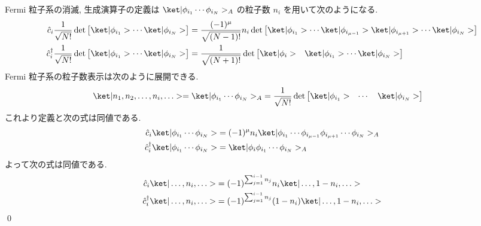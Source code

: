 \documentclass[uplatex,dvipdfmx,a4paper,11pt]{jlreq}
\makeatletter
\numberwithin{equation}{section}
\theoremstyle{definition}
\renewenvironment{proof}[1][\proofname]{\par
  \normalfont
  \topsep6\p@\@plus6\p@ \trivlist
  \item[\hskip\labelsep{\bfseries #1}\@addpunct{\bfseries}]\ignorespaces\quad\par
}{%
  \qed\endtrivlist\@endpefalse
}
\renewcommand\proofname{証明}
\makeatother
\begin{document}
\begin{proof}
  Fermi 粒子系の消滅, 生成演算子の定義は $\ket|\phi_{i_1}\cdots\phi_{i_N}>_A$ の粒子数 $n_i$ を用いて次のようになる.
  \begin{align}
    \hat{c}_i\frac{1}{\sqrt{N!}}\det\begin{bmatrix}\ket|\phi_{i_1}> \cdots \ket|\phi_{i_N}>\end{bmatrix}         & = \frac{(-1)^\mu}{\sqrt{(N-1)!}}n_i\det\begin{bmatrix}\ket|\phi_{i_1}> \cdots \ket|\phi_{i_{\mu-1}}>\ket|\phi_{i_{\mu+1}}>\cdots\ket|\phi_{i_N}>\end{bmatrix} \\
    \hat{c}_i^\dagger\frac{1}{\sqrt{N!}}\det\begin{bmatrix}\ket|\phi_{i_1}> \cdots \ket|\phi_{i_N}>\end{bmatrix} & = \frac{1}{\sqrt{(N+1)!}}\det\begin{bmatrix}\ket|\phi_i> & \ket|\phi_{i_1}> \cdots \ket|\phi_{i_N}>\end{bmatrix}
  \end{align}
  Fermi 粒子系の粒子数表示は次のように展開できる.
  \begin{align}
    \ket|n_1,n_2,\ldots,n_i,\ldots> = \ket|\phi_{i_1}\cdots\phi_{i_N}>_A & = \frac{1}{\sqrt{N!}}\det\begin{bmatrix}\ket|\phi_{i_1}> & \cdots & \ket|\phi_{i_N}>\end{bmatrix}
  \end{align}
  これより定義と次の式は同値である.
  \begin{align}
    \hat{c}_i\ket|\phi_{i_1}\cdots\phi_{i_N}>         & = (-1)^\mu n_i\ket|\phi_{i_1}\cdots\phi_{i_{\mu-1}}\phi_{i_{\mu+1}}\cdots\phi_{i_N}>_A \\
    \hat{c}_i^\dagger\ket|\phi_{i_1}\cdots\phi_{i_N}> & = \ket|\phi_i\phi_{i_1}\cdots\phi_{i_N}>_A
  \end{align}
  よって次の式は同値である.
  \begin{align}
    \hat{c}_i\ket|\ldots,n_i,\ldots>         & = (-1)^{\sum_{j=1}^{i-1}n_j} n_i\ket|\ldots,1-n_i,\ldots>    \\
    \hat{c}_i^\dagger\ket|\ldots,n_i,\ldots> & = (-1)^{\sum_{j=1}^{i-1}n_j}(1-n_i)\ket|\ldots,1-n_i,\ldots>
  \end{align}
\end{proof}
\end{document}
